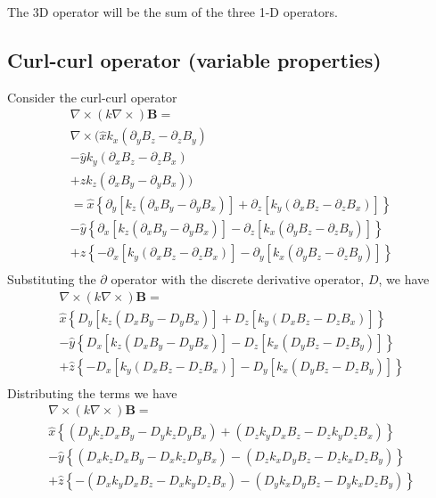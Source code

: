 \documentclass[11pt]{article}
\begin{document}
The 3D operator will be the sum of the three 1-D operators.

\subsection{Curl-curl operator (variable properties)}

Consider the curl-curl operator
\begin{multline}
  \nabla \times (k \nabla \times) \mathbf{B} = \\
  \nabla \times (
  \hat{x} k_x (\partial_y B_z - \partial_z B_y) \\
  - \hat{y} k_y (\partial_x B_z - \partial_z B_x) \\
  + \hat{z} k_z (\partial_x B_y - \partial_y B_x) ) \\  =
   \hat{x} \left\{ \partial_y \left[ k_z (\partial_x B_y - \partial_y B_x) \right] +
    \partial_z \left[ k_y (\partial_x B_z - \partial_z B_x) \right] \right\} \\
  -\hat{y} \left\{ \partial_x \left[ k_z (\partial_x B_y - \partial_y B_x) \right] -
   \partial_z \left[ k_x (\partial_y B_z - \partial_z B_y) \right]  \right\} \\
  +\hat{z} \left\{ -\partial_x \left[ k_y (\partial_x B_z - \partial_z B_x) \right] -
   \partial_y \left[ k_x (\partial_y B_z - \partial_z B_y) \right]  \right\} \\
\end{multline}
Substituting the $\partial$ operator with the discrete derivative operator, $D$, we have
\begin{multline}
  \nabla \times (k \nabla \times) \mathbf{B} = \\
   \hat{x} \left\{ D_y \left[ k_z (D_x B_y - D_y B_x) \right] +
    D_z \left[ k_y (D_x B_z - D_z B_x) \right] \right\} \\
  -\hat{y} \left\{ D_x \left[ k_z (D_x B_y - D_y B_x) \right] -
   D_z \left[ k_x (D_y B_z - D_z B_y) \right]  \right\} \\
  +\hat{z} \left\{ -D_x \left[ k_y (D_x B_z - D_z B_x) \right] -
   D_y \left[ k_x (D_y B_z - D_z B_y) \right]  \right\} \\
\end{multline}
Distributing the terms we have
\begin{multline}
  \nabla \times (k \nabla \times) \mathbf{B} = \\
   \hat{x} \left\{   (D_y k_z D_x B_y - D_y k_z D_y B_x)   +  (D_z k_y D_x B_z - D_z k_y D_z B_x) \right\} \\
  -\hat{y} \left\{   (D_x k_z D_x B_y - D_x k_z D_y B_x)   -  (D_z k_x D_y B_z - D_z k_x D_z B_y) \right\} \\
  +\hat{z} \left\{ - (D_x k_y D_x B_z - D_x k_y D_z B_x)   -  (D_y k_x D_y B_z - D_y k_x D_z B_y) \right\} \\
\end{multline}
\end{document}

